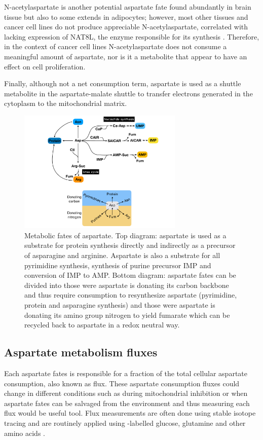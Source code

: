 N-acetylaspartate is another potential aspartate fate found abundantly in brain tissue but also to some extends in adipocytes; however, most other tissues and cancer cell lines do not produce appreciable N-acetylaspartate, correlated with lacking expression of NAT8L, the enzyme responsible for its synthesis \cite{Alkan2020-td}.
Therefore, in the context of cancer cell lines N-acetylaspartate does not consume a meaningful amount of aspartate, nor is it a metabolite that appear to have an effect on cell proliferation.

Finally, although not a net consumption term, aspartate is used as a shuttle metabolite in the aspartate-malate shuttle to transfer electrons generated in the cytoplasm to the mitochondrial matrix.

\begin{figure}
    \centering
    \includegraphics[width=0.70\textwidth]{figures/chap1/asp_fates.pdf}
    \caption[Metabolic fates of aspartate]{
    Metabolic fates of aspartate.
    Top diagram: aspartate is used as a substrate for protein synthesis directly and indirectly as a precursor of asparagine and arginine.
    Aspartate is also a substrate for all pyrimidine synthesis, synthesis of purine precursor IMP and conversion of IMP to AMP.
    Bottom diagram: aspartate fates can be divided into those were aspartate is donating its carbon backbone and thus require \NAD{} consumption to resynthesize aspartate (pyrimidine, protein and asparagine synthesis) and those were aspartate is donating its amino group nitrogen to yield fumarate which can be recycled back to aspartate in a redox neutral way.
    }
    \label{fig:ch1:asp_fates}
\end{figure}




\subsection{Aspartate metabolism fluxes}
Each aspartate fates is responsible for a fraction of the total cellular aspartate consumption, also known as flux.
These aspartate consumption fluxes could change in different conditions such as during mitochondrial inhibition or when aspartate fates can be salvaged from the environment and thus measuring each flux would be useful tool.
Flux measurements are often done using stable isotope tracing and are routinely applied using \hCi{}-labelled glucose, glutamine and other amino acids \cite{Yuan2008-eu, Park2016-ap, Jang2018-ey, Bartman2021-ey}.

